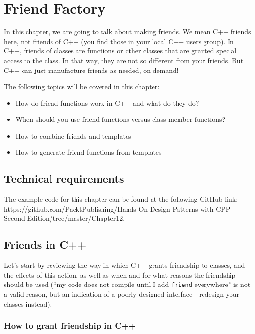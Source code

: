 ﻿\chapter{Friend Factory}

In this chapter, we are going to talk about making friends. We mean C++ friends here, not friends of C++ (you find those in your local C++ users group). In C++, friends of classes are functions or other classes that are granted special access to the class. In that way, they are not so different from your friends. But C++ can just manufacture friends as needed, on demand!

The following topics will be covered in this chapter:

\begin{itemize}
\item
  How do friend functions work in C++ and what do they do?
\item
  When should you use friend functions versus class member functions?
\item
  How to combine friends and templates
\item
  How to generate friend functions from templates
\end{itemize}

\section{Technical requirements}

The example code for this chapter can be found at the following GitHub link: https://github.com/PacktPublishing/Hands-On-Design-Patterns-with-CPP-Second-Edition/tree/master/Chapter12.

\section{Friends in C++}

Let's start by reviewing the way in which C++ grants friendship to classes, and the effects of this action, as well as when and for what reasons the friendship should be used (``my code does not compile until I add \texttt{friend} everywhere'' is not a valid reason, but an indication of a poorly designed interface - redesign your classes instead).

\subsection{How to grant friendship in C++}

